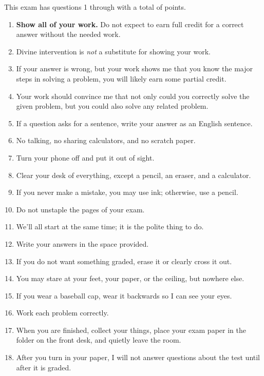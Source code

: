 \documentclass[12pt,fleqn]{exam}
\begin{document}
\noindent  This exam   has questions 1 through  \numquestions \/ with a total of  \numpoints\/  points.  
\noindent \begin{tcolorbox}
    \begin{minipage}{6.5in}
    \begin{enumerate}
    
    \normalsize 
    \item \textbf{Show all of your work.} Do not expect to earn full credit for a correct answer without the needed work.
    
    \item Divine intervention is \emph{not} a substitute for showing your work.
    
    
    \item If your answer is wrong, but your work shows me that you know the major steps in solving a problem, you will likely earn
    some partial credit.
    
    \item Your work should convince me that not only could you correctly solve the given 
    problem, but you could also solve any related problem.
    
    \item If a question asks for a sentence, write your answer as an English sentence. 
    
    \item No talking, no sharing calculators, and no scratch paper.
    \item  Turn your phone off and put it out of sight.
    \item  Clear your desk of everything, except a pencil, an eraser, and a calculator.
    \item If you never make a mistake, you may use ink; otherwise, use a pencil.
    \item Do not unstaple the pages of your exam.
    \item We'll all start at the same time; it is  the polite thing to do.
    \item Write your answers in the space provided. 
    \item If you do not want something graded, erase it or clearly cross it out. 
    \item You may stare at your feet, your paper, or the ceiling, but nowhere else. 
    \item If you wear a  baseball cap, wear it backwards so I can see your eyes.
    \item Work each problem correctly.
    \item When you are finished, collect your things, place your exam paper in the folder on the front desk,
    and quietly leave the room.
    \item After you turn in your paper, I will not answer questions about the test until after it is graded.
    

\end{enumerate}
\end{minipage}
\end{tcolorbox}
\end{document}
